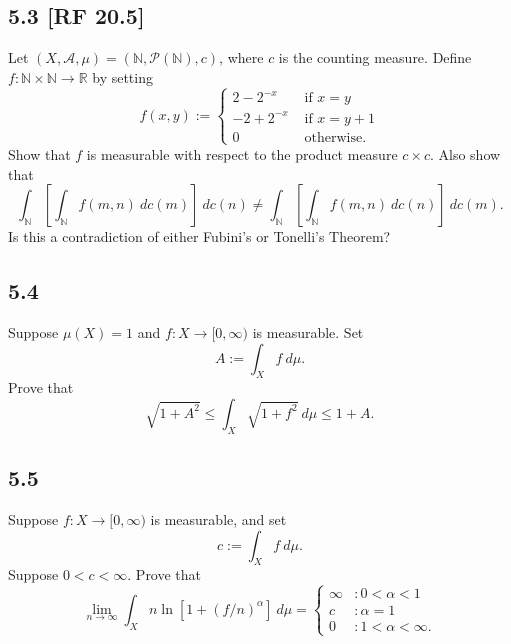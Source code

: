 \documentclass[12pt]{article}
\begin{document}
\subsection*{5.3 [RF 20.5]}
\begin{tcolorbox}
Let $(X,\mathcal{A},\mu) = (\mathbb{N}, \mathcal{P}(\mathbb{N}), c)$, where $c$ is the counting measure. Define $f : \mathbb{N} \times \mathbb{N}
\rightarrow \mathbb{R}$ by setting 
\[ f(x,y) := \left\{ \begin{array}{cl}
2 - 2^{-x} & \text{ if } x = y \\
-2 + 2^{-x} & \text{ if } x = y + 1 \\
0 & \text{ otherwise. }
\end{array} \right.
\]
Show that $f$ is measurable with respect to the product measure $c\times c$. Also show that 
\[ \int_{\mathbb{N}}\left[ \int_{\mathbb{N}}f(m,n)\ dc(m) \right]\ dc(n) \neq \int_{\mathbb{N}}\left[ \int_{\mathbb{N}}f(m,n)\ dc(n) \right]\ dc(m).\]
Is this a contradiction of either Fubini's or Tonelli's Theorem?
\end{tcolorbox}


\subsection*{5.4}
\begin{tcolorbox}
Suppose $\mu(X) = 1$ and $f : X \rightarrow [0,\infty)$ is measurable. Set 
\[ A := \int_{X}f\ d\mu. \]
Prove that 
\[ \sqrt{1 + A^{2}} \leq \int_{X}\sqrt{1  +f^{2}}\ d\mu \leq 1 + A. \]
\end{tcolorbox}



\subsection*{5.5}
\begin{tcolorbox}
Suppose $f : X \rightarrow [0, \infty)$ is measurable, and set 
\[ c := \int_{X}f\ d\mu. \]
Suppose $0 < c < \infty$. Prove that 
\[ \lim_{n\rightarrow\infty}\int_{X}n\ln[1 + (f/n)^{\alpha}]\ d\mu = \left\{ \begin{array}{cl}
\infty & : 0 < \alpha < 1 \\
c & : \alpha = 1 \\
0 & : 1 < \alpha < \infty.
\end{array} \right.
\]
\end{tcolorbox}
\end{document}
